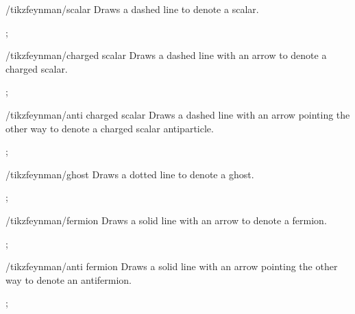 \documentclass[a4paper,final]{ltxdoc}
\begin{document}
\begin{key}{/tikzfeynman/scalar}
  Draws a dashed line to denote a scalar.

\begin{codeexample}[]
;
\end{codeexample}
\end{key}

\begin{key}{/tikzfeynman/charged scalar}
  Draws a dashed line with an arrow to denote a charged scalar.

\begin{codeexample}[]
;
\end{codeexample}
\end{key}

\begin{key}{/tikzfeynman/anti charged scalar}
  Draws a dashed line with an arrow pointing the other way to denote a charged
  scalar antiparticle.

\begin{codeexample}[]
;
\end{codeexample}
\end{key}

\begin{key}{/tikzfeynman/ghost}
  Draws a dotted line to denote a ghost.

\begin{codeexample}[]
;
\end{codeexample}
\end{key}


\begin{key}{/tikzfeynman/fermion}
  Draws a solid line with an arrow to denote a fermion.

\begin{codeexample}[]
;
\end{codeexample}
\end{key}

\begin{key}{/tikzfeynman/anti fermion}
  Draws a solid line with an arrow pointing the other way to denote an antifermion.

\begin{codeexample}[]
;
\end{codeexample}
\end{key}
\end{document}
